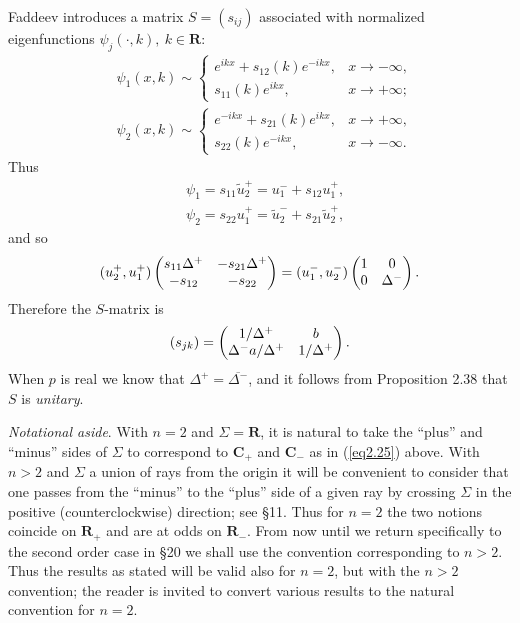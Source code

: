 \documentclass{surv-l}
\theoremstyle{plain}
\theoremstyle{definition}
\numberwithin{equation}{chapter}
\begin{document}
Faddeev \cite{Fa1} introduces a matrix $S=(s_{ij})$ associated with normalized eigenfunctions $\psi_{j}(\cdot, k),\ k\in \mathbf{R}$:
\begin{align*}
&\psi_{1}(x,k)\sim\left\{\begin{array}{ll}
e^{ikx}+s_{12}(k)e^{-ikx}, & x\rightarrow-\infty,\\
s_{11}(k)e^{ikx}, & x\rightarrow+\infty;
\end{array}\right.\\
&\psi_{2}(x, k)\sim\left\{\begin{array}{ll}
e^{-ikx}+s_{21}(k)e^{ikx}, & x\rightarrow+\infty,\\
s_{22}(k)e^{-ikx}, & x\rightarrow-\infty.
\end{array}\right.
\end{align*}
Thus
\begin{align*}
&\psi_{1}=s_{11}\tilde{u}_{2}^{+}=u_{1}^{-}+s_{12}u_{1}^{+},\\
&\psi_{2}=s_{22}u_{1}^{+}=\tilde{u}_{2}^{-}+s_{21}\tilde{u}_{2}^{+},
\end{align*}
and so
\begin{equation*}
(u_{2}^{+}, u_{1}^{+}) \left(\begin{array}{@{}cc@{}}
s_{11}\Delta^{+} & -s_{21}\Delta^{+}\\
-s_{12} & -s_{22}
\end{array}\right)=(u_{1}^{-}, u_{2}^{-}) \left(\begin{array}{@{}cc@{}}
1 & 0\\
0 & \Delta^{-}
\end{array}\right).
\end{equation*}
Therefore the $S$-matrix is
\begin{equation*}
(s_{jk})=\left(\begin{array}{@{}cc@{}}
1/\Delta^{+} & b\\
\Delta^{-}a/\Delta^{+} & 1/\Delta^{+}
\end{array}\right).
\end{equation*}
When $p$ is real we know that $\Delta^{+}=\overline{\Delta^{-}}$, and it follows from Proposition 2.38 that $S$ is \emph{unitary}.

\emph{Notational aside}. With $n=2$ and $\Sigma=\mathbf{R}$, it is natural to take the ``plus'' and ``minus'' sides of $\Sigma$ to correspond to $\mathbf{C}_{+}$ and $\mathbf{C}_{-}$ as in (\ref{eq2.25}) above. With $n >2$ and $\Sigma$ a union of rays from the origin it will be convenient to consider that one passes from the ``minus'' to the ``plus'' side of a given ray by crossing $\Sigma$ in the positive (counterclockwise) direction; see \S 11. Thus for $n=2$ the two notions coincide on $\mathbf{R}_{+}$ and are at odds on $\mathbf{R}_{-}$. From now until we return specifically to the second order case in \S 20 we shall use the convention corresponding to $n>2$. Thus the results as stated will be valid also for $n=2$, but with the $n >2$ convention; the reader is invited to convert various results to the natural convention for $n=2$.
\end{document}
